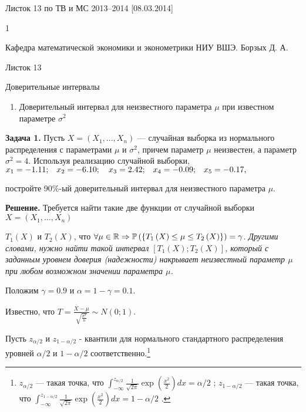 









Листок 13 по ТВ и МС 2013--2014 [08.03.2014]







1

Кафедра математической экономики и эконометрики НИУ ВШЭ. Борзых Д. А.

Листок 13

Доверительные интервалы



\begin{enumerate}
\item  Доверительный интервал для неизвестного параметра $\mu $ при известном параметре \textbf{$\sigma ^{2} $}
\end{enumerate}

 

\textbf{Задача 1.}  Пусть $X=\left(X_{1} ,...,X_{n} \right)$ --- случайная выборка из нормального распределения с параметрами $\mu $ и $\sigma ^{2} $, причем параметр $\mu $ неизвестен, а параметр $\sigma ^{2} =4$. Используя реализацию случайной выборки, $x_{1} =-{\rm 1.11;}\quad x_{2} =-{\rm 6.1}0;\quad x_{3} ={\rm 2.42;}\quad x_{4} =-0.0{\rm 9;}\quad x_{5} =-0.{\rm 17,}$ 

постройте 90\%-ый доверительный интервал для неизвестного параметра $\mu $.

\textbf{Решение.} Требуется найти такие две функции от случайной выборки $X=\left(X_{1} ,...,X_{n} \right)$ 

$T_{1} \left(X\right)$ и $T_{2} \left(X\right)$, что $\forall \mu \in {\mathbb R}\Rightarrow {\rm {\mathbb P}}\left(\left\{T_{1} \left(X\right)\le \mu \le T_{2} \left(X\right)\right\}\right)=\gamma $. \textit{Другими словами, нужно найти такой интервал $\left[T_{1} \left(X\right);T_{2} \left(X\right)\right]$, который с заданным уровнем доверия (надежности) накрывает неизвестный параметр $\mu $ при любом возможном значении параметра $\mu $.}

Положим $\gamma =0.9$ и $\alpha =1-\gamma =0.1$.

Известно, что $T=\frac{\overline{X}-\mu }{\sqrt{{\tfrac{\sigma ^{2} }{n}} } } \sim N\left(0;1\right)$.

Пусть $z_{\alpha /2} $ и $z_{1-\alpha /2} $ - квантили для нормального стандартного распределения уровней $\alpha /2$ и $1-\alpha /2$ соответственно.\footnote{  $z_{\alpha /2} $  --- такая точка, что  $\int _{-\infty }^{z_{\alpha /2} }{\tfrac{1}{\sqrt{2\pi } }} \exp \left({\tfrac{x^{2} }{2}} \right)dx =\alpha /2$ ;  $z_{1-\alpha /2} $  --- такая точка, что  $\int _{-\infty }^{z_{1-\alpha /2} }{\tfrac{1}{\sqrt{2\pi } }} \exp \left({\tfrac{x^{2} }{2}} \right)dx =1-\alpha /2$ .} 

